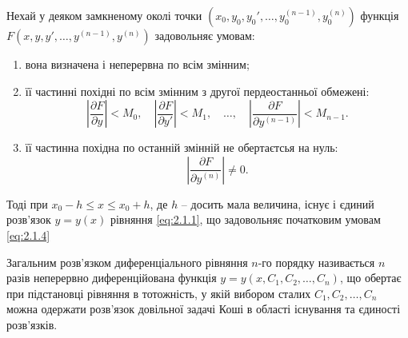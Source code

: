 \begin{theorem}
	Нехай у деяком замкненому околі точки $\left(x_0, y_0, y_0', \ldots, y_0^{(n-1)}, y_0^{(n)}\right)$ функція $F\left(x,y,y',\ldots,y^{(n-1)},y^{(n)}\right)$ задовольняє умовам:
	\begin{enumerate}
		\item вона визначена і неперервна по всім змінним;
		\item її частинні похідні по всім змінним з другої пердеостанньої обмежені:
		\begin{equation}
			\label{eq:2.1.6}
			\left|\frac{\partial F}{\partial y}\right| < M_0, \quad \left|\frac{\partial F}{\partial y'}\right| < M_1, \quad \ldots, \quad \left|\frac{\partial F}{\partial y^{(n-1)}}\right| < M_{n-1}.
		\end{equation}
		\item її частинна похідна по останній змінній не обертаєтсья на нуль: \[\left|\frac{\partial F}{\partial y^{(n)}}\right|\ne0.\]
	\end{enumerate}
	Тоді при $x_0 - h \le x \le x_0 + h$, де $h$ -- досить мала величина, існує і єдиний розв’язок $y=y(x)$ рівняння \eqref{eq:2.1.1}, що задовольняє початковим умовам \eqref{eq:2.1.4}
\end{theorem}
\begin{definition}
	Загальним розв’язком диференціального рівняння $n$-го порядку називається $n$ разів неперервно диференційована функція $y=y(x,C_1,C_2,\ldots,C_n)$, що обертає при підстановці рівняння в тотожність, у якій вибором сталих $C_1, C_2, \ldots, C_n$ можна одержати розв’язок довільної задачі Коші в області існування та єдиності розв’язків.
\end{definition}

